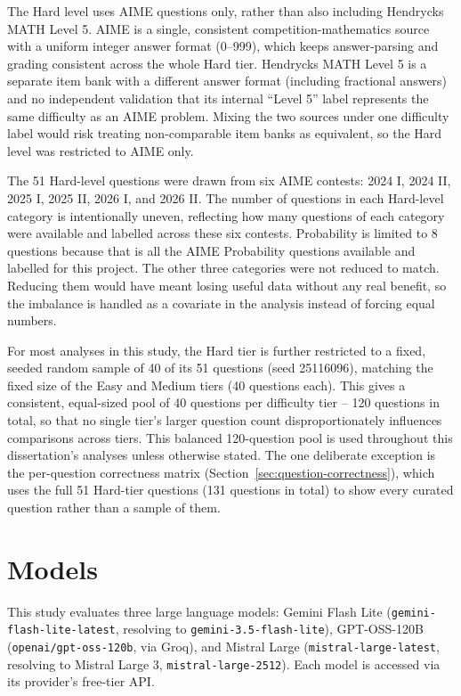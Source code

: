 The Hard level uses AIME questions only, rather than also including
Hendrycks MATH Level 5. AIME is a single, consistent competition-mathematics
source with a uniform integer answer format (0--999), which keeps
answer-parsing and grading consistent across the whole Hard tier. Hendrycks
MATH Level 5 is a separate item bank with a different answer format
(including fractional answers) and no independent validation that its
internal ``Level 5'' label represents the same difficulty as an AIME
problem. Mixing the two sources under one difficulty label would risk
treating non-comparable item banks as equivalent, so the Hard level was
restricted to AIME only.

The 51 Hard-level questions were drawn from six AIME contests: 2024 I,
2024 II, 2025 I, 2025 II, 2026 I, and 2026 II. The number of questions in
each Hard-level category is intentionally uneven, reflecting how many
questions of each category were available and labelled across these six
contests. Probability is limited to 8 questions because that is all the
AIME Probability questions available and labelled for this project. The
other three categories were not reduced to match. Reducing them would
have meant losing useful data without any real benefit, so the imbalance
is handled as a covariate in the analysis instead of forcing equal
numbers.

For most analyses in this study, the Hard tier is further restricted to
a fixed, seeded random sample of 40 of its 51 questions (seed 25116096),
matching the fixed size of the Easy and Medium tiers (40 questions each).
This gives a consistent, equal-sized pool of 40 questions per difficulty
tier -- 120 questions in total, so that no single tier's larger
question count disproportionately influences comparisons across tiers.
This balanced 120-question pool is used throughout this dissertation's
analyses unless otherwise stated. The one deliberate exception is the
per-question correctness matrix (Section~\ref{sec:question-correctness}),
which uses the full 51 Hard-tier questions (131 questions in total) to
show every curated question rather than a sample of them.

\section{Models}
\label{sec:models}

This study evaluates three large language models: Gemini Flash Lite
(\texttt{gemini-flash-lite-latest}, resolving to
\texttt{gemini-3.5-flash-lite}), GPT-OSS-120B (\texttt{openai/gpt-oss-120b},
via Groq), and Mistral Large (\texttt{mistral-large-latest}, resolving to
Mistral Large 3, \texttt{mistral-large-2512}). Each model is accessed via
its provider's free-tier API.

